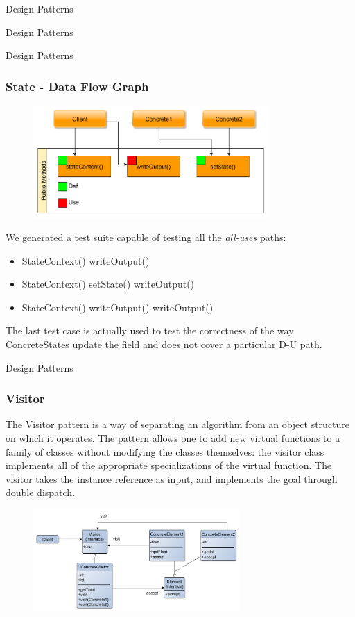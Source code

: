 \documentclass{beamer}
\begin{document}
\begin{section}{Design Patterns}
\begin{subsection}{Design Patterns}
\begin{frame}
	\end{frame}
\end{subsection}

\begin{subsection}{Design Patterns}
	\begin{frame}
		\frametitle{State - Data Flow Graph}
\begin{figure}[!h]
	\centering
	\includegraphics[width=0.8\textwidth]{./State/CallGraph.png}
	\label{Sdataflow}
\end{figure}

We generated a test suite capable of testing all the \textit{all-uses} paths:
\begin{itemize}
	\item StateContext() writeOutput() 
	\item StateContext() setState() writeOutput()
	\item StateContext() writeOutput() writeOutput()
\end{itemize}

The last test case is actually used to test the correctness of the way ConcreteStates update the field and does not cover a particular D-U path.
	
	\end{frame}
\end{subsection}

\begin{subsection}{Design Patterns}
	\begin{frame}
		\frametitle{Visitor}
The Visitor pattern is a way of separating an algorithm from an object structure on which it operates. {\footnotesize The pattern allows one to add new virtual functions to a family of classes without modifying the classes themselves: the visitor class implements all of the appropriate specializations of the virtual function. The visitor takes the instance reference as input, and implements the goal through double dispatch.}
		
\begin{figure}[!h]
	\centering
	\includegraphics[width=0.7\textwidth]{./Visitor/ClassDiagram.png}
	\label{ViclassDiag}
\end{figure}
		

\end{frame}
\end{subsection}
\end{section}
\end{document}
